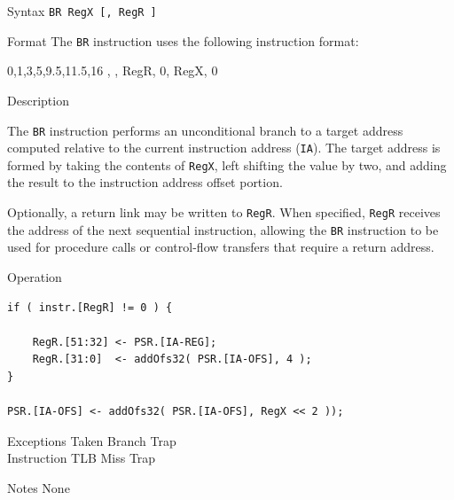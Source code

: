 \pagebreak
{}

\begin{iPageDescEntry}{Syntax}
\texttt{BR RegX [, RegR ]}
\end{iPageDescEntry}

\begin{iPageDescEntry}{Format}
The \texttt{BR} instruction uses the following instruction format: \\

\begin{flushleft}
\drawInstrFormat
    {0,1,3,5,9.5,11.5,16}
    {\OpCodeGrpBR, \OpCodeBR, RegR, 0, RegX, 0}
\end{flushleft}
\end{iPageDescEntry}

\begin{iPageDescEntry}{Description}

The \texttt{BR} instruction performs an unconditional branch to a target address computed relative to the current instruction address (\texttt{IA}). The target address is formed by taking the contents of \texttt{RegX}, left shifting the value by two, and adding the result to the instruction address offset portion.

Optionally, a return link may be written to \texttt{RegR}. When specified, \texttt{RegR} receives the address of the next sequential instruction, allowing the \texttt{BR} instruction to be used for procedure calls or control-flow transfers that require a return address.

\end{iPageDescEntry}

\begin{iPageDescOpEntry}{Operation}
\begin{lstlisting}[style=iPageOpStyle]
if ( instr.[RegR] != 0 ) {

    RegR.[51:32] <- PSR.[IA-REG];
    RegR.[31:0]  <- addOfs32( PSR.[IA-OFS], 4 );
}

PSR.[IA-OFS] <- addOfs32( PSR.[IA-OFS], RegX << 2 ));
\end{lstlisting}
\end{iPageDescOpEntry}

\begin{iPageDescEntry}{Exceptions}
Taken Branch Trap \\
Instruction TLB Miss Trap
\end{iPageDescEntry}

\begin{iPageDescEntry}{Notes}
None
\end{iPageDescEntry}